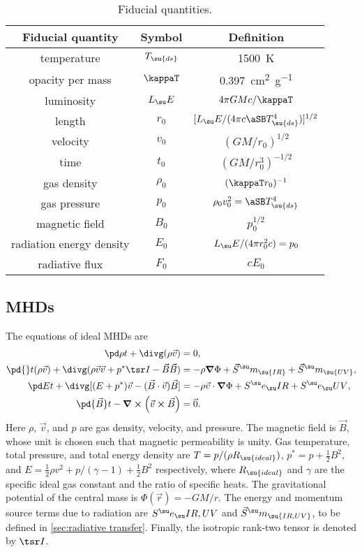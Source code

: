 \documentclass[twocolumn]{article}
\newcommand*\momsrc[1]{\vec S^\su m_\su{#1}}
\begin{document}
\begin{table}
\caption{Fiducial quantities.}
\label{tab:fiducial}
\begin{tabular}{ccc}
\toprule
Fiducial quantity & Symbol & Definition \\\midrule
temperature & $T_\su{ds}$ & \SI{1500}{\kelvin} \\
opacity per mass & $\kappaT$ & \SI{0.397}{\centi\meter\squared\per\gram} \\
luminosity & $L_\su E$ & $4\pi GMc/\kappaT$ \\
length & $r_0$ & $[L_\su E/(4\pi c\aSB T_\su{ds}^4)]^{1/2}$ \\
velocity & $v_0$ & $(GM/r_0)^{1/2}$ \\
time & $t_0$ & $(GM/r_0^3)^{-1/2}$ \\
gas density & $\rho_0$ & $(\kappaT r_0)^{-1}$ \\
gas pressure & $p_0$ & $\rho_0v_0^2=\aSB T_\su{ds}^4$ \\
magnetic field & $B_0$ & $p_0^{1/2}$ \\
radiation energy density & $E_0$ & $L_\su E/(4\pi r_0^2c)=p_0$ \\
radiative flux & $F_0$ & $cE_0$ \\
\bottomrule
\end{tabular}
\end{table}

\subsection{\texorpdfstring{\Aclp*{MHD}}{Magnetohydrodynamics}}

The equations of ideal \acp{MHD} are
\begin{align}
\label{eq:gas mass}
\pd\rho t+\divg(\rho\vec v) &= 0, \\
\label{eq:gas momentum}
\pd{}t(\rho\vec v)+\divg(\rho\vec v\vec v+p^*\tsr I-\vec B\vec B) &=
  -\rho\grad\Phi+\momsrc{IR}+\momsrc{UV}, \\
\label{eq:gas energy}
\pd Et+\divg[(E+p^*)\vec v-(\vec B\cdot\vec v)\vec B] &=
  -\rho\vec v\cdot\grad\Phi+\ergsrc{IR}+\ergsrc{UV}, \\
\label{eq:induction}
\pd{\vec B}t-\curl(\vec v\cross\vec B) &= \vec0.
\end{align}
Here $\rho$, $\vec v$, and $p$ are gas density, velocity, and pressure. The
magnetic field is $\vec B$, whose unit is chosen such that magnetic
permeability is unity. Gas temperature, total pressure, and total energy
density are $T=p/(\rho R_\su{ideal})$, $p^*=p+\tfrac12B^2$, and $E=\tfrac12\rho
v^2+p/(\gamma-1)+\tfrac12B^2$ respectively, where $R_\su{ideal}$ and $\gamma$
are the specific ideal gas constant and the ratio of specific heats. The
gravitational potential of the central mass is $\Phi(\vec r)=-GM/r$. The energy
and momentum source terms due to radiation are $\ergsrc{IR,UV}$ and
$\momsrc{IR,UV}$, to be defined in \cref{sec:radiative transfer}. Finally, the
isotropic rank-two tensor is denoted by $\tsr I$.
\end{document}
